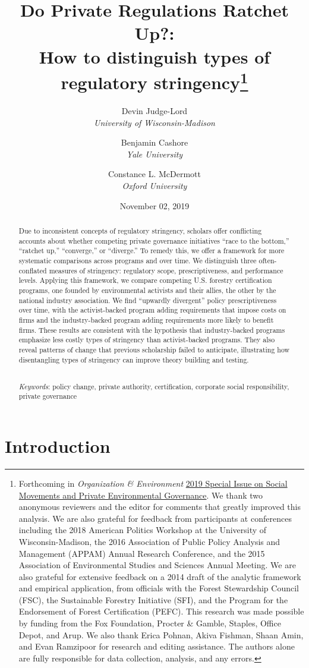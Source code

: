 \documentclass[
      12pt,
            Review ]{article}
\title{Do Private Regulations Ratchet Up?: 
           \\ How to distinguish types of regulatory stringency\thanks{Forthcoming in \emph{Organization \& Environment} \href{https://journals.sagepub.com/doi/full/10.1177/1086026619853783}{2019 Special Issue on Social Movements and Private Environmental Governance}. We thank two anonymous reviewers and the editor for comments that greatly improved this analysis. We are also grateful for feedback from participants at conferences including the 2018 American Politics Workshop at the University of Wisconsin-Madison, the 2016 Association of Public Policy Analysis and Management (APPAM) Annual Research Conference, and the 2015 Association of Environmental Studies and Sciences Annual Meeting. We are also grateful for extensive feedback on a 2014 draft of the analytic framework and empirical application, from officials with the Forest Stewardship Council (FSC), the Sustainable Forestry Initiative (SFI), and the Program for the Endorsement of Forest Certification (PEFC). This research was made possible by funding from the Fox Foundation, Procter \& Gamble, Staples, Office Depot, and Arup. We also thank Erica Pohnan, Akiva Fishman, Shaan Amin, and Evan Ramzipoor for research and editing assistance. The authors alone are fully responsible for data collection, analysis, and any errors.}}
\author{ %
            Devin Judge-Lord  \\ \emph{University of Wisconsin-Madison} 
             \and 
            Benjamin Cashore  \\ \emph{Yale University} 
             \and 
            Constance L. McDermott  \\ \emph{Oxford University} 
            }
\date{November 02, 2019}
\begin{document}
 


  \maketitle




  \begin{abstract}
    \noindent Due to inconsistent concepts of regulatory stringency, scholars offer conflicting accounts about whether competing private governance initiatives ``race to the bottom,'' ``ratchet up,'' ``converge,'' or ``diverge.'' To remedy this, we offer a framework for more systematic comparisons across programs and over time. We distinguish three often-conflated measures of stringency: regulatory scope, prescriptiveness, and performance levels. Applying this framework, we compare competing U.S. forestry certification programs, one founded by environmental activists and their allies, the other by the national industry association. We find ``upwardly divergent'' policy prescriptiveness over time, with the activist-backed program adding requirements that impose costs on firms and the industry-backed program adding requirements more likely to benefit firms. These results are consistent with the hypothesis that industry-backed programs emphasize less costly types of stringency than activist-backed programs. They also reveal patterns of change that previous scholarship failed to anticipate, illustrating how disentangling types of stringency can improve theory building and testing. 

          \hfill \\ 
      \noindent \emph{Keywords}: policy change, private authority, certification, corporate social responsibility, private governance 
    
  \end{abstract}










\noindent 
      \doublespacing 
    \newpage

\hypertarget{introduction}{%
\section{Introduction}\label{introduction}}
\end{document}
